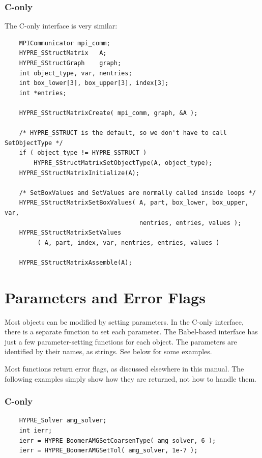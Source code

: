 \subsubsection{C-only}

The C-only interface is very similar:
\begin{verbatim}
    MPICommunicator mpi_comm;
    HYPRE_SStructMatrix   A;
    HYPRE_SStructGraph    graph;
    int object_type, var, nentries;
    int box_lower[3], box_upper[3], index[3];
    int *entries;

    HYPRE_SStructMatrixCreate( mpi_comm, graph, &A );

    /* HYPRE_SSTRUCT is the default, so we don't have to call SetObjectType */
    if ( object_type != HYPRE_SSTRUCT )
        HYPRE_SStructMatrixSetObjectType(A, object_type);
    HYPRE_SStructMatrixInitialize(A);

    /* SetBoxValues and SetValues are normally called inside loops */
    HYPRE_SStructMatrixSetBoxValues( A, part, box_lower, box_upper, var,
                                     nentries, entries, values );
    HYPRE_SStructMatrixSetValues
         ( A, part, index, var, nentries, entries, values )

    HYPRE_SStructMatrixAssemble(A);
\end{verbatim}


\section{Parameters and Error Flags}

Most \hypre{} objects can be modified by setting parameters.  In the
C-only interface, there is a separate function to set each parameter.
The Babel-based interface has just a few parameter-setting functions
for each object.  The parameters are identified by their names, as
strings.  See below for some examples.

Most \hypre{} functions return error flags, as discussed elsewhere in
this manual. The following examples simply show how they are returned,
not how to handle them.

\subsubsection{C-only}
\begin{verbatim}
    HYPRE_Solver amg_solver;
    int ierr;
    ierr = HYPRE_BoomerAMGSetCoarsenType( amg_solver, 6 );
    ierr = HYPRE_BoomerAMGSetTol( amg_solver, 1e-7 );
\end{verbatim}

